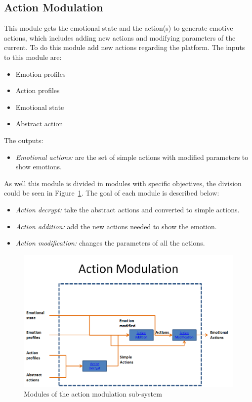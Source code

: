 \subsection{Action Modulation}
This module gets the emotional state and the action(s) to generate emotive actions, which includes adding new actions and modifying parameters of the current. To do this module add new actions regarding the platform. The inputs to this module are:
\begin{itemize}
	\item Emotion profiles
	\item Action profiles
	\item Emotional state
	\item Abstract action
\end{itemize}
The outputs:
\begin{itemize}
	\item \textit{Emotional actions:} are the set of simple actions with modified parameters to show emotions.
\end{itemize}
As well this module is divided in modules with specific objectives, the division could be seen in Figure~\ref{fig:actionModulation}. The goal of each module is described below:
\begin{itemize}
	\item \textit{Action decrypt:} take the abstract actions and converted to simple actions.
	\item \textit{Action addition:} add the new actions needed to show the emotion.
	\item \textit{Action modification:} changes the parameters of all the actions.
\end{itemize}
\begin{figure}
	\centering
	\includegraphics[width=1.0\textwidth]{./Images/Architecture/ActionModulation.png} 
	\caption{Modules of the action modulation sub-system}
	\label{fig:actionModulation}
\end{figure}
